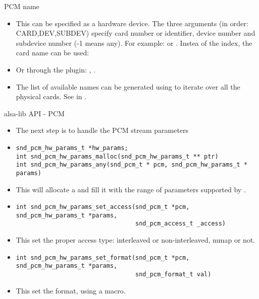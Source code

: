 \begin{frame}{PCM name}
  \begin{itemize}
  \item This can be specified as a hardware device. The three
    arguments (in order: CARD,DEV,SUBDEV) specify card number or
    identifier, device number and subdevice number (-1 means any). For
    example:  or . Instea of the index, the
    card name can be used: 
  \item Or through the  plugin: ,
    .
  \item The list of available names can be generated using
     to iterate over all the physical cards. See
     in .
  \end{itemize}
\end{frame}

\begin{frame}[fragile]{alsa-lib API - PCM}
  \begin{itemize}
  \item The next step is to handle the PCM stream parameters
  \item
    \begin{block}{}
    \fontsize{9}{9}\selectfont
      \begin{verbatim}
snd_pcm_hw_params_t *hw_params;
int snd_pcm_hw_params_malloc(snd_pcm_hw_params_t ** ptr)
int snd_pcm_hw_params_any(snd_pcm_t * pcm, snd_pcm_hw_params_t * params)
      \end{verbatim}
      \end{block}
    \item This will allocate a  and fill it
      with the range of parameters supported by .
  \item
    \begin{block}{}
    \fontsize{9}{9}\selectfont
      \begin{verbatim}
int snd_pcm_hw_params_set_access(snd_pcm_t *pcm, snd_pcm_hw_params_t *params,
                                 snd_pcm_access_t _access)
      \end{verbatim}
    \end{block}
    \item This set the proper access type: interleaved or
      non-interleaved, mmap or not.
  \item
    \begin{block}{}
    \fontsize{9}{9}\selectfont
      \begin{verbatim}
int snd_pcm_hw_params_set_format(snd_pcm_t *pcm, snd_pcm_hw_params_t *params,
                                 snd_pcm_format_t val)
      \end{verbatim}
    \end{block}
    \item This set the format, using a  macro.
  \end{itemize}
\end{frame}

